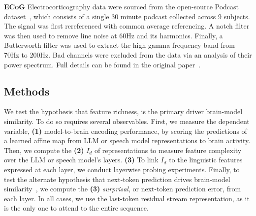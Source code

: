 \documentclass{article}
\theoremstyle{plain}
\theoremstyle{definition}
\theoremstyle{remark}
\newcommand{\mypar}[1]{\textbf{#1}\quad}
\begin{document}

\mypar{ECoG} Electrocorticography data were sourced from the open-source Podcast dataset~\cite{zada2025podcast}, which consists of a single 30 minute podcast collected across 9 subjects. The signal was first rereferenced with common average referencing. A notch filter was then used to remove line noise at 60Hz and its harmonics. Finally, a Butterworth filter was used to extract the high-gamma frequency band from 70Hz to 200Hz. Bad channels were excluded from the data via an analysis of their power spectrum. Full details can be found in the original paper~\cite{zada2025podcast}.

\subsection{Methods}
We test the hypothesis that feature richness, is the primary driver brain-model similarity. To do so requires several observables. First, we measure the dependent variable, \textbf{(1)} model-to-brain encoding performance, by scoring the predictions of a learned affine map from LLM or speech model representations to brain activity. Then, we compute the \textbf{(2)} $I_d$ of representations to measure feature complexity over the LLM or speech model's layers. \textbf{(3)} To link $I_d$ to the linguistic features expressed at each layer, we conduct layerwise probing experiments. Finally, to test the alternate hypothesis that next-token prediction drives brain-model similarity~\cite{schrimpf2018brain, caucheteux2023evidence,goldstein2022shared}, we compute the \textbf{(3)} \emph{surprisal}, or next-token prediction error, from each layer. In all cases, we use the last-token residual stream representation, as it is the only one to attend to the entire sequence.
\end{document}
